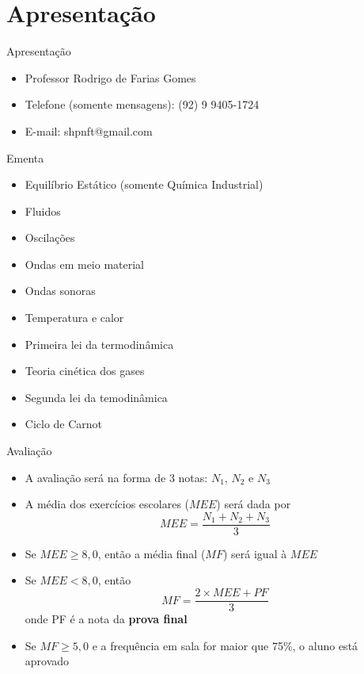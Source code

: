 \section{Apresentação}

\begin{frame}%
    \titlepage
\end{frame}

\begin{frame}[c]{Apresentação}
    \begin{itemize}
        \item Professor Rodrigo de Farias Gomes
        \item Telefone (somente mensagens): (92) 9 9405-1724
        \item E-mail: shpnft@gmail.com
    \end{itemize}
\end{frame}

\begin{frame}{Ementa}
    \begin{itemize}
        \item Equilíbrio Estático (somente Química Industrial)
        \item Fluidos
        \item Oscilações
        \item Ondas em meio material
        \item Ondas sonoras
        \item Temperatura e calor
        \item Primeira lei da termodinâmica
        \item Teoria cinética dos gases
        \item Segunda lei da temodinâmica
        \item Ciclo de Carnot
    \end{itemize}
\end{frame}

\begin{frame}{Avaliação}
    \begin{itemize}
        \item A avaliação será na forma de 3 notas: \(N_1\), \(N_2\) e \(N_3\)
        \item A média dos exercícios escolares (\(MEE\)) será dada por
            \[
                MEE=\frac{N_1+N_2+N_3}{3}
            \]
        \item Se \(MEE \geq 8,0\), então a média final (\(MF\)) será igual à \(MEE\)
        \item Se \(MEE < 8,0\), então
            \[
                MF=\frac{2\times MEE+PF}{3}
            \]
            onde PF é a nota da \textbf{prova final}
        \item Se \(MF \geq 5,0\) e a frequência em sala for maior que 75\%, o aluno está aprovado
    \end{itemize}
\end{frame}

